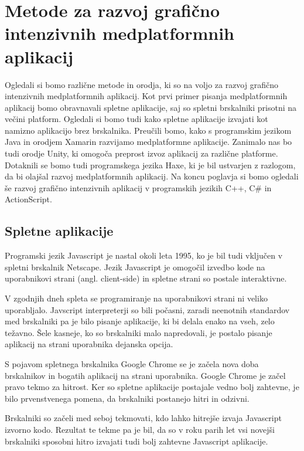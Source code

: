\chapter{Metode za razvoj grafično intenzivnih medplatformnih aplikacij}

Ogledali si bomo različne metode in orodja, ki so na voljo za razvoj grafično intenzivnih medplatformnih aplikacij. Kot prvi primer pisanja medplatformnih aplikacij bomo obravnavali spletne aplikacije, saj so spletni brskalniki prisotni na večini platform. Ogledali si bomo tudi kako spletne aplikacije izvajati kot namizno aplikacijo brez brskalnika. Preučili bomo, kako s programskim jezikom Java in orodjem Xamarin razvijamo medplatformne aplikacije. Zanimalo nas bo tudi orodje Unity, ki omogoča preprost izvoz aplikacij za različne platforme. Dotaknili se bomo tudi programskega jezika Haxe, ki je bil ustvarjen z razlogom, da bi olajšal razvoj medplatformnih aplikacij. Na koncu poglavja si bomo ogledali še razvoj grafično intenzivnih aplikacij v programskih jezikih C++, C\# in ActionScript.

\section{Spletne aplikacije}

Programski jezik Javascript je nastal okoli leta 1995, ko je bil tudi vključen v spletni brskalnik Netscape. Jezik Javascript je omogočil izvedbo kode na uporabnikovi strani (angl. client-side) in spletne strani so postale interaktivne.

V zgodnjih dneh spleta se programiranje na uporabnikovi strani ni veliko uporabljalo. Javscript interpreterji so bili počasni, zaradi neenotnih standardov med brskalniki pa je bilo pisanje aplikacije, ki bi delala enako na vseh, zelo težavno. Šele kasneje, ko so brskalniki malo napredovali, je postalo pisanje aplikacij na strani uporabnika dejanska opcija.

S pojavom spletnega brskalnika Google Chrome se je začela nova doba brskalnikov in bogatih aplikacij na strani uporabnika. Google Chrome je začel pravo tekmo za hitrost. Ker so spletne aplikacije postajale vedno bolj zahtevne, je bilo prvenstvenega pomena, da brskalniki postanejo hitri in odzivni.

Brskalniki so začeli med seboj tekmovati, kdo lahko hitrejše izvaja Javascript izvorno kodo. Rezultat te tekme pa je bil, da so v roku parih let vsi novejši brskalniki sposobni hitro izvajati tudi bolj zahtevne Javascript aplikacije. 

